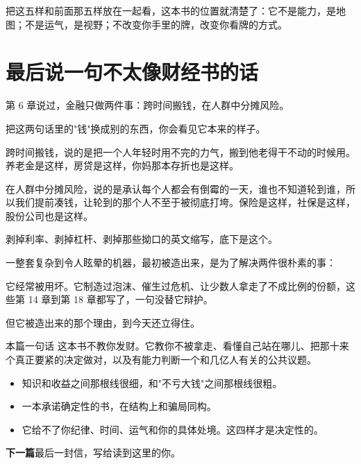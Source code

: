 把这五样和前面那五样放在一起看，这本书的位置就清楚了：它不是能力，是地图；不是运气，是视野；不改变你手里的牌，改变你看牌的方式。

\bookbreak

\section{最后说一句不太像财经书的话}

第 6 章说过，金融只做两件事：跨时间搬钱，在人群中分摊风险。

把这两句话里的"钱"换成别的东西，你会看见它本来的样子。

跨时间搬钱，说的是把一个人年轻时用不完的力气，搬到他老得干不动的时候用。养老金是这样，房贷是这样，你妈那本存折也是这样。

在人群中分摊风险，说的是承认每个人都会有倒霉的一天，谁也不知道轮到谁，所以我们提前凑钱，让轮到的那个人不至于被彻底打垮。保险是这样，社保是这样，股份公司也是这样。

剥掉利率、剥掉杠杆、剥掉那些拗口的英文缩写，底下是这个。

一整套复杂到令人眩晕的机器，最初被造出来，是为了解决两件很朴素的事：

它经常被用坏。它制造过泡沫、催生过危机、让少数人拿走了不成比例的份额，这些第 14 章到第 18 章都写了，一句没替它辩护。

但它被造出来的那个理由，到今天还立得住。

\begin{takeaway}{本篇一句话}
这本书不教你发财。它教你不被拿走、看懂自己站在哪儿、把那十来个真正要紧的决定做对，以及有能力判断一个和几亿人有关的公共议题。

\begin{itemize}
  \item 知识和收益之间那根线很细，和"不亏大钱"之间那根线很粗。
  \item 一本承诺确定性的书，在结构上和骗局同构。
  \item 它给不了你纪律、时间、运气和你的具体处境。这四样才是决定性的。
\end{itemize}

\end{takeaway}

\begin{bridgebox}
\textbf{下一篇}最后一封信，写给读到这里的你。
\end{bridgebox}

